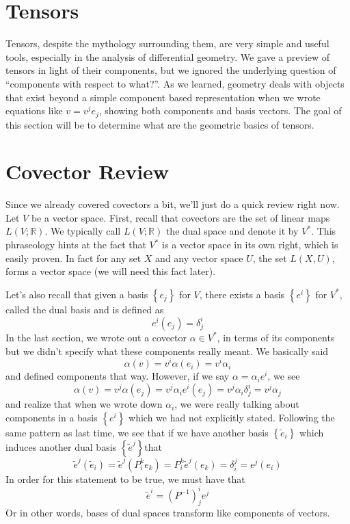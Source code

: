 \documentclass[a4paper]{article}
\begin{document}
\section*{Tensors}%
Tensors, despite the mythology surrounding them, are very simple and useful tools, especially in the analysis of differential geometry. We gave a preview of tensors in light of their components, but we ignored the underlying question of ``components with respect to what?''. As we learned, geometry deals with objects that exist beyond a simple component based representation when we wrote equations like $v = v^je_j$, showing both components and basis vectors. The goal of this section will be to determine what are the geometric basics of tensors.

\section*{Covector Review}%
Since we already covered covectors a bit, we'll just do a quick review right now. Let $V$ be a vector space. First, recall that covectors are the set of linear maps $L(V; \mathds{R})$. We typically call $L(V; \mathds{R})$ the dual space and denote it by $V^*$. This phraseology hints at the fact that $V^*$ is a vector space in its own right, which is easily proven. In fact for any set $X$ and any vector space $U$, the set $L(X,U)$, forms a vector space (we will need this fact later).

Let's also recall that given a basis $ \left\{ e_j \right\}$ for $V$, there exists a basis $ \left\{ e^i \right\}$ for $V^*$, called the dual basis and is defined as
\[
  e^i(e_j) = \delta_j^i
\]
In the last section, we wrote out a covector $\alpha \in V^*$, in terms of its components but we didn't specify what these components really meant. We basically said
\[
  \alpha(v) = v^i \alpha(e_i) = v^i \alpha_i
\]
and defined components that way. However, if we say $\alpha = \alpha_i e^i$, we see
\[
  \alpha(v) = v^j \alpha(e_j) = v^j \alpha_i e^i(e_j) =  v^j \alpha_i \delta_j^i = v^j\alpha_j
\]
and realize that when we wrote down $\alpha_i$, we were really talking about components in a basis $ \left\{ e^i \right\}$ which we had not explicitly stated. Following the same pattern as last time, we see that if we have another basis $ \left\{ \tilde{e}_i \right\}$ which induces another dual basis $ \left\{ \tilde{e}^j \right\}$that
\[
  \tilde{e}^j \left( \tilde{e}_i \right) =  \tilde{e}^j  \left( P_i^k e_k \right) = P_i^k \tilde{e}^j \left( e_k \right) = \delta_i^j = e^j (e_i)
\]
In order for this statement to be true, we must have that
\[
  \tilde{e}^i = (P^{-1})_j^i e^j
\]
Or in other words, bases of dual spaces transform like components of vectors.
\end{document}
